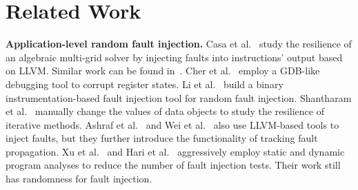 \section{Related Work}
\begin{spacing}{0.9}
\textbf{Application-level random fault injection.}
Casa et al.~\cite{mg_ics12} 
study the resilience of an algebraic multi-grid solver 
by injecting faults into instructions' output based on LLVM. 
Similar work can be found in~\cite{europar14:calhoun, prdc13:sharma}.
Cher et al.~\cite{sc14:cher} employ a GDB-like debugging tool to corrupt register states.
Li et al.~\cite{bifit:sc12} build a binary instrumentation-based fault injection tool 
for random fault injection.
Shantharam et al.~\cite{2-shantharam2011characterizing} manually change the values of data objects %
to study the resilience of iterative methods.
Ashraf et al.~\cite{sc15:ashraf} and Wei et al.~\cite{dsn14:wei} also use LLVM-based tools to inject faults, but
they further introduce the functionality of tracking fault propagation. 
Xu et al.~\cite{dsn12:xu} and Hari et al.~\cite{asplos12:hari} aggressively employ static and dynamic program analyses to reduce the number of fault injection tests.
Their work %
still has randomness for fault injection.

\begin{comment}
Fault injection can also happen at the circuit level with radiation exposed to processor chips~\cite{aspdac14:cher, sc14:cher},
or be simulated with the architecture-level simulators~\cite{hpcs11:Bohm, asplos10:feng}.  
In general, the random fault injection can be inaccurate if the fault injections are not sufficient. Our methodology avoids the randomness.
\end{comment}


\end{spacing}
